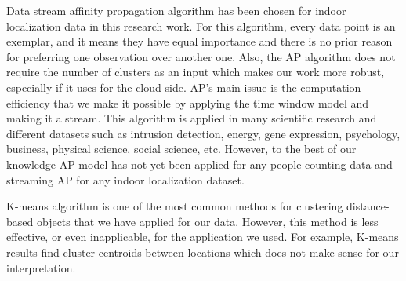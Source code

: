 \documentclass[../UNBThesis2.tex]{subfiles}
\begin{document}
Data stream affinity propagation algorithm has been chosen for indoor localization data in this research work. For this algorithm, every data point is an exemplar, and it means they have equal importance and there is no prior reason for preferring one observation over another one. Also, the AP algorithm does not require the number of clusters as an input which makes our work more robust, especially if it uses for the cloud side. AP's main issue is the computation efficiency that we make it possible by applying the time window model and making it a stream. This algorithm is applied in many scientific research and different datasets such as intrusion detection, energy, gene expression, psychology, business, physical science, social science, etc. However, to the best of our knowledge AP model has not yet been applied for any people counting data and streaming AP for any indoor localization dataset.

K-means algorithm is one of the most common methods for clustering distance-based objects that we have applied for our data. However, this method is less effective, or even inapplicable, for the application we used. For example, K-means results find cluster centroids between locations which does not make sense for our interpretation. 


\end{document}
